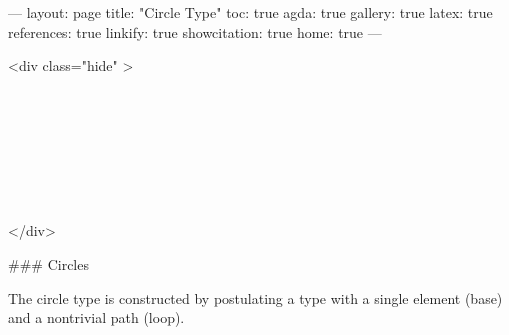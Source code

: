 ---
layout: page
title: "Circle Type"
toc: true
agda: true
gallery: true
latex: true
references: true
linkify: true
showcitation: true
home: true
---

<div class="hide" >
\begin{code}%
\>[0]\AgdaSymbol{\{-\#}\AgdaSpace{}%
\AgdaSpace{}%
\AgdaSpace{}%
\AgdaSymbol{\#-\}}\<%
\\
\>[0]\AgdaSpace{}%
\AgdaSpace{}%
\<%
\\
\>[0]\AgdaSpace{}%
\AgdaSpace{}%
\<%
\\
%
\\[\AgdaEmptyExtraSkip]%
\>[0]\AgdaSpace{}%
\AgdaSpace{}%
\<%
\\
\>[0]\AgdaSpace{}%
\AgdaSpace{}%
\<%
\\
\>[0]\AgdaSpace{}%
\AgdaSpace{}%
\<%
\end{code}
</div>

### Circles

The circle type is constructed by postulating a type with
a single element (base) and a nontrivial path (loop).


